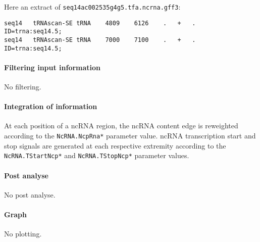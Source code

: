 Here an extract of \texttt{seq14ac002535g4g5.tfa.ncrna.gff3}:
\begin{Verbatim}[fontsize=\tiny]
seq14	tRNAscan-SE	tRNA	4809	6126	.	+	.	ID=trna:seq14.5;
seq14	tRNAscan-SE	tRNA	7000	7100	.	+	.	ID=trna:seq14.5;
\end{Verbatim}

\paragraph{Filtering input information}

No filtering.

\paragraph{Integration of information}

At each position of a ncRNA region, the ncRNA content edge is reweighted according to the 
\texttt{NcRNA.NcpRna*} parameter value. ncRNA transcription start and stop signals 
are generated at each respective extremity according to the \texttt{NcRNA.TStartNcp*} and \texttt{NcRNA.TStopNcp*} parameter values.


\paragraph{Post analyse}

No post analyse.

\paragraph{Graph}

No plotting.










